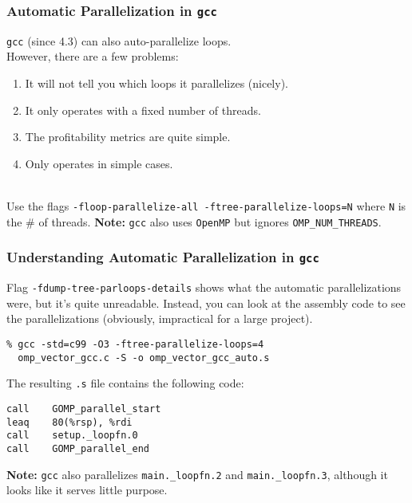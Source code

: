 \documentclass[aspectratio=43]{beamer}
\newenvironment{changemargin}[1]{%
  \begin{list}{}{%
    \setlength{\topsep}{0pt}%
    \setlength{\leftmargin}{#1}%
    \setlength{\rightmargin}{1em}
    \setlength{\listparindent}{\parindent}%
    \setlength{\itemindent}{\parindent}%
    \setlength{\parsep}{\parskip}%
  }%
  \item[]}{\end{list}}
\begin{document}
\begin{frame}[fragile]
  \frametitle{Automatic Parallelization in {\tt gcc}}

\begin{changemargin}{1.5cm}
  {\tt gcc} (since 4.3) can also auto-parallelize loops. \\
  However, there are
      a few problems:
      \begin{enumerate}
        \item It will not tell you which loops it parallelizes (nicely).
        \item It only operates with a fixed number of threads.
        \item The profitability metrics are quite simple.
        \item Only operates in simple cases.
      \end{enumerate}
   ~\\[1em]

  Use the flags {\tt -floop-parallelize-all -ftree-parallelize-loops=N} where {\tt N} is the \# of
  threads.
  \vfill
  {\bf Note:} {\tt gcc} also uses {\tt OpenMP} but ignores
  {\tt OMP\_NUM\_THREADS}.
\end{changemargin}

\end{frame}

\begin{frame}[fragile]
  \frametitle{Understanding Automatic Parallelization in {\tt gcc}}

\begin{changemargin}{1.5cm}
  Flag {\tt -fdump-tree-parloops-details} shows what the automatic
  parallelizations were, but it's quite unreadable.
  \vfill
  Instead, you can look at the assembly code to see the parallelizations
  (obviously, impractical for a large project).
  \begin{lstlisting}
% gcc -std=c99 -O3 -ftree-parallelize-loops=4
  omp_vector_gcc.c -S -o omp_vector_gcc_auto.s
  \end{lstlisting}
  \vfill
  The resulting {\tt .s} file contains the following code:
  \begin{lstlisting}
call    GOMP_parallel_start
leaq    80(%rsp), %rdi
call    setup._loopfn.0
call    GOMP_parallel_end
  \end{lstlisting}
  \vfill
  {\bf Note:} {\tt gcc} also parallelizes {\tt main.\_loopfn.2} and
  {\tt main.\_loopfn.3}, although it looks like it serves little purpose.
\end{changemargin}

\end{frame}
\end{document}
